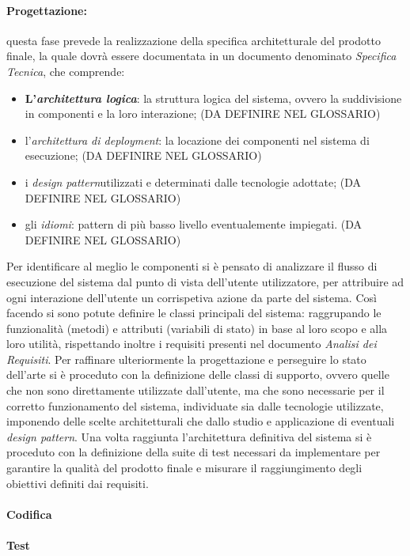 \paragraph{Progettazione:} questa fase prevede la realizzazione della specifica architetturale del prodotto finale, la quale dovrà essere documentata in un documento denominato \textit{Specifica Tecnica}, che comprende:
\begin{itemize}
    \item \textbf{L'\textit{architettura logica}}\glo: la struttura logica del sistema, ovvero la suddivisione in componenti e la loro interazione; (DA DEFINIRE NEL GLOSSARIO)
    \item l'\textit{architettura di deployment}\glo: la locazione dei componenti nel sistema di esecuzione; (DA DEFINIRE NEL GLOSSARIO)
    \item i \textit{design pattern}\glo utilizzati e determinati dalle tecnologie adottate; (DA DEFINIRE NEL GLOSSARIO)
    \item gli \textit{idiomi}\glo: pattern di più basso livello eventualemente impiegati. (DA DEFINIRE NEL GLOSSARIO)
\end{itemize}
Per identificare al meglio le componenti si è pensato di analizzare il flusso di esecuzione del sistema dal punto di vista dell'utente utilizzatore, per attribuire ad ogni interazione dell'utente un corrispetiva azione da parte del sistema. \newline
Così facendo si sono potute definire le classi principali del sistema: raggrupando le funzionalità (metodi) e attributi (variabili di stato) in base al loro scopo e alla loro utilità, rispettando inoltre i requisiti presenti nel documento \textit{Analisi dei Requisiti}. \newline
Per raffinare ulteriormente la progettazione e perseguire lo stato dell'arte si è proceduto con la definizione delle classi di supporto, ovvero quelle che non sono direttamente utilizzate dall'utente, ma che sono necessarie per il corretto funzionamento del sistema, individuate sia dalle tecnologie utilizzate, imponendo delle scelte architetturali che dallo studio e applicazione di eventuali \textit{design pattern}. \newline
Una volta raggiunta l'architettura definitiva del sistema si è proceduto con la definizione della suite di test necessari da implementare per garantire la qualità del prodotto finale e misurare il raggiungimento degli obiettivi definiti dai requisiti. 

\paragraph{Codifica}

\paragraph{Test}


